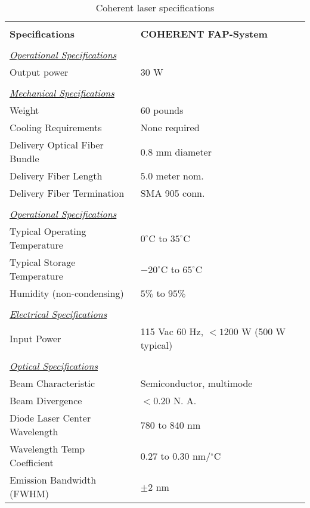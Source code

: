 {\begin{table}
\begin{center}
\begin{tabular}{|l|l|}
\hline
& \\
{\bf Specifications}&{\bf COHERENT FAP-System} \\
\hline
& \\
\underline {\it Operational Specifications}& \\
Output power			& 30 W \\
& \\
\underline {\it Mechanical Specifications}& \\
Weight			        & 60 pounds  \\
Cooling Requirements 		& None required \\
Delivery Optical Fiber Bundle   & 0.8 mm diameter \\
Delivery Fiber Length		& 5.0 meter nom.\\
Delivery Fiber Termination	& SMA 905 conn. \\
& \\
\underline {\it Operational Specifications}& \\
Typical Operating Temperature   & $0^\circ$C to $35^\circ$C \\
Typical Storage Temperature     & $-20^\circ$C to $65^\circ$C \\
Humidity (non-condensing)       & $5\%$ to $95\%$  \\
& \\
\underline {\it Electrical Specifications}& \\
Input Power	                & 115 Vac 60 Hz, $<1200$ W (500 W typical) \\
& \\
\underline {\it Optical Specifications}& \\
Beam Characteristic 		& Semiconductor, multimode \\
Beam Divergence        & $<0.20$ N. A. \\
Diode Laser Center Wavelength   & 780 to 840 nm \\
Wavelength Temp Coefficient	& 0.27 to 0.30 nm/$^\circ$C \\
Emission Bandwidth (FWHM)       & $\pm 2$ nm \\
\hline
\end{tabular}
\label{tab:coherent}
\caption{Coherent laser specifications}
\end{center}
\end{table}

}

